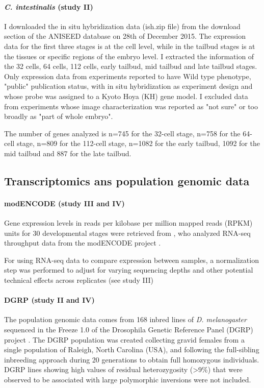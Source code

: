 \paragraph{\textit{C. intestinalis} (study II)}

I downloaded the in situ hybridization data (ish.zip file) from the download section of the ANISEED database on 28th of December 2015. 
The expression data for the first three stages is at the cell level, while in the tailbud stages is at the tissues or specific regions of the embryo level. 
I extracted the information of the 32 cells, 64 cells, 112 cells, early tailbud, mid tailbud and late tailbud stages. Only expression data from experiments reported to have Wild type phenotype, "public" publication status, with in situ hybridization as experiment design and whose probe was assigned to a Kyoto Hoya (KH) \citep{Satou2008} gene model.
I excluded data from experiments whose image characterization was reported as "not sure" or too broadly as "part of whole embryo".

The number of genes analyzed is n=745 for the 32-cell stage, n=758 for the 64-cell stage, n=809 for the 112-cell stage, n=1082 for the early tailbud, 1092 for the mid tailbud and 887 for the late tailbud. 

\subsection{Transcriptomics ans population genomic data}

\paragraph{modENCODE (study III and IV)}

Gene expression levels in reads per kilobase per million mapped reads (RPKM) units for 30 developmental stages were retrieved from \citet{Gelbart2013}, who analyzed RNA-seq throughput data from the modENCODE project \citep{Graveley2011}.

For using RNA-seq data to compare expression between samples, a normalization step was performed to adjust for varying sequencing depths and other potential technical effects across replicates (see study III)

\paragraph{DGRP (study II and IV)}

The population genomic data comes from 168 inbred lines of \textit{D. melanogaster} sequenced in the Freeze 1.0 of the Drosophila Genetic Reference Panel (DGRP) project \citep{Mackay2012}. The DGRP population was created collecting gravid females from a single population of Raleigh, North Carolina (USA), and following the full-sibling inbreeding approach during 20 generations to obtain full homozygous individuals. 
DGRP lines showing high values of residual heterozygosity (>9\%) that were observed to be associated with large polymorphic inversions \citep{Huang2014} were not included.

